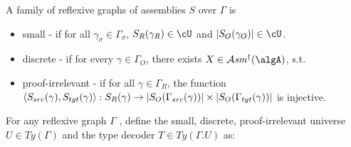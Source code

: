 \documentclass[12pt,a4paper]{article}
\def\cAsm{\mathcal{A}\mathit{sm}^\dagger}
\def\src{_{src}}\alwaysmath{src}
\def\rfl{_{refl}}\alwaysmath{rfl}
\def\tgt{_{tgt}}\alwaysmath{tgt}
\renewcommand{\O}{_{O}}
\newcommand{\R}{\ensuremath{_{R}}}
\begin{document}
A family of reflexive graphs of assemblies $S$ over $\Gamma$ is
\begin{itemize}
  \item small - if for all $\gamma_\sigma \in \Gamma_\sigma$, $S\R(\gamma\R) \in \cU$ and $\carr{S\O(\gamma\O)} \in \cU$.
  
  \item discrete - if for every $\gamma \in \Gamma\O$, there exists $X \in \cAsm(\algA)$, s.t.
   
  
  \item proof-irrelevant - if for all $\gamma \in \Gamma\R$, the function $\langle S\src(\gamma), S\tgt(\gamma) \rangle : S\R(\gamma) \to \carr{S\O(\Gamma\src(\gamma))} \times \carr{S\O(\Gamma\tgt(\gamma))}$ is injective.
\end{itemize}
For any reflexive graph $\Gamma$ , define the small, discrete, proof-irrelevant universe $U \in Ty(\Gamma)$ and the type decoder $T \in Ty(\Gamma . U)$ as:
\end{document}
